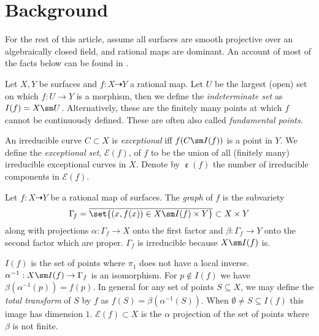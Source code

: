 \documentclass[11pt, final]{amsart}
\newcommand{\dashto}{\dashrightarrow}
\newcommand{\E}{\mathcal{E}}
\newcommand{\nin}{\notin}
\newcommand{\emp}{\emptyset}
\DeclareMathOperator{\comp}{\mathfrak e}
\begin{document}
\pagebreak

\section{Background}\label{sec:back}

For the rest of this article, assume all surfaces are smooth projective over an algebraically closed field, and rational maps are dominant. An account of most of the facts below can be found in \cite[\S V]{Hart}.

Let $X, Y$ be surfaces and $f : X \dashto Y$ a rational map. Let $U$ be the largest (open) set on which $f : U \to Y$ is a morphism, then we define the \emph{indeterminate set} as $I(f) = X \sm U$. Alternatively, these are the finitely many points at which $f$ cannot be continuously defined. These are often also called \emph{fundamental points}.

An irreducible curve $C \subset X$ is \emph{exceptional} iff $f(C\sm I(f))$ is a point in $Y$. We define the \emph{exceptional set}, $\E(f)$, of $f$ to be the union of all (finitely many) irreducible exceptional curves in $X$. Denote by $\comp(f)$ the number of irreducible components in $\E(f)$.
 
Let $f : X \dashrightarrow Y$ be a rational map of surfaces. The \emph{graph} of $f$ is the subvariety \[\Gamma_{\!f} = \overline{\set{(x, f(x)) \in X\sm I(f) \times Y}} \subset X\times Y\] along with projections $\alpha : \Gamma_{\!f} \to X$ onto the first factor and $\beta : \Gamma_{\!f} \to Y$ onto the second factor which are proper. $\Gamma_{\!f}$ is irreducible because $X \sm I(f)$ is.


$I(f)$ is the set of points where $\pi_1$ does not have a local inverse. $\alpha^{-1} : X \sm I(f) \to \Gamma_f$ is an isomorphism.  For $p \nin I(f)$ we have $\beta(\alpha^{-1}(p)) = f(p)$.
 In general for any set of points $S \subseteq X$, we may define the \emph{total transform} of $S$ by $f$ as $f(S) = \beta(\alpha^{-1}(S))$. When $\emp \ne S \subseteq I(f)$ this image has dimension $1$. 
 $\E(f) \subset X$ is the $\alpha$ projection of the set of points where $\beta$ is not finite.
\end{document}
